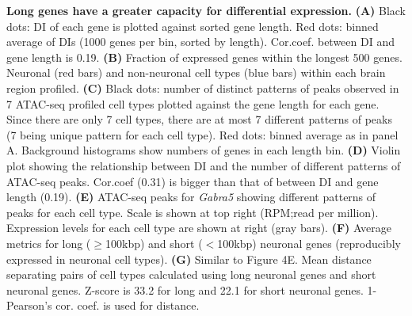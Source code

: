 \textbf{Long genes have a greater capacity for differential expression.}
\textbf{(A)} Black dots: DI of each gene is plotted against sorted gene length. Red dots: binned average of DIs (1000 genes per bin, sorted by length). Cor.coef. between DI and gene length is 0.19. 
\textbf{(B)} Fraction of expressed genes within the longest 500 genes. Neuronal (red bars) and non-neuronal cell types (blue bars) within each brain region profiled.
\textbf{(C)} Black dots: number of distinct patterns of peaks observed in 7 ATAC-seq profiled cell types plotted against the gene length for each gene. Since there are only 7 cell types, there are at most 7 different patterns of peaks (7 being unique pattern for each cell type). Red dots: binned average as in panel A. Background histograms show numbers of genes in each length bin. 
\textbf{(D)} Violin plot showing the relationship between DI and the number of different patterns of ATAC-seq peaks. Cor.coef (0.31) is bigger than that of between DI and gene length (0.19).
\textbf{(E)} ATAC-seq peaks for \textit{Gabra5} showing different patterns of peaks for each cell type. Scale is shown at top right (RPM;read per million).  Expression levels for each cell type are shown at right (gray bars).
\textbf{(F)} Average metrics for long ($\geq$100kbp) and short ($<$100kbp) neuronal genes (reproducibly expressed in neuronal cell types). 
\textbf{(G)} Similar to Figure 4E. Mean distance separating pairs of cell types calculated using long neuronal genes and short neuronal genes. Z-score is 33.2 for long and 22.1 for short neuronal genes. 1-Pearson's cor. coef. is used for distance.
